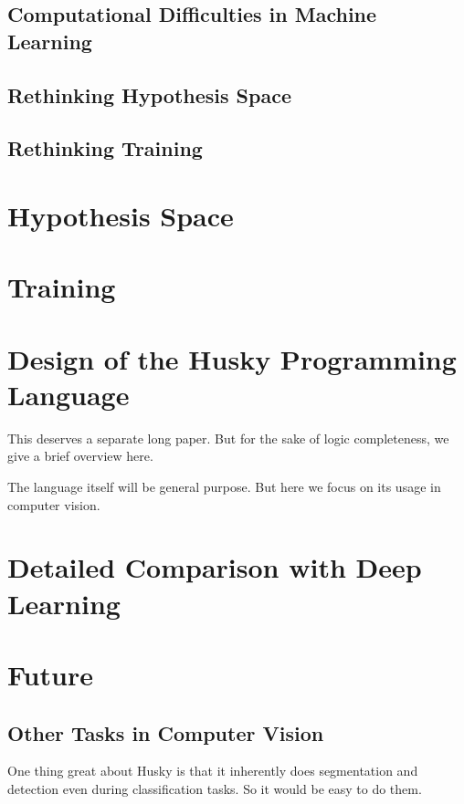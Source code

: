 \documentclass[11pt, oneside]{article}   	%
\theoremstyle{definition}
\begin{document}
\subsection{Computational Difficulties in Machine Learning}

\subsection{Rethinking Hypothesis Space}

\subsection{Rethinking Training}

\section{Hypothesis Space}

\section{Training}

\section{Design of the Husky Programming Language}

This deserves a separate long paper. But for the sake of logic completeness, we give a brief overview here.

The language itself will be general purpose. But here we focus on its usage in computer vision.

\section{Detailed Comparison with Deep Learning}

\section{Future}

\subsection{Other Tasks in Computer Vision}

One thing great about Husky is that it inherently does segmentation and detection even during classification tasks. So it would be easy to do them.
\end{document}
